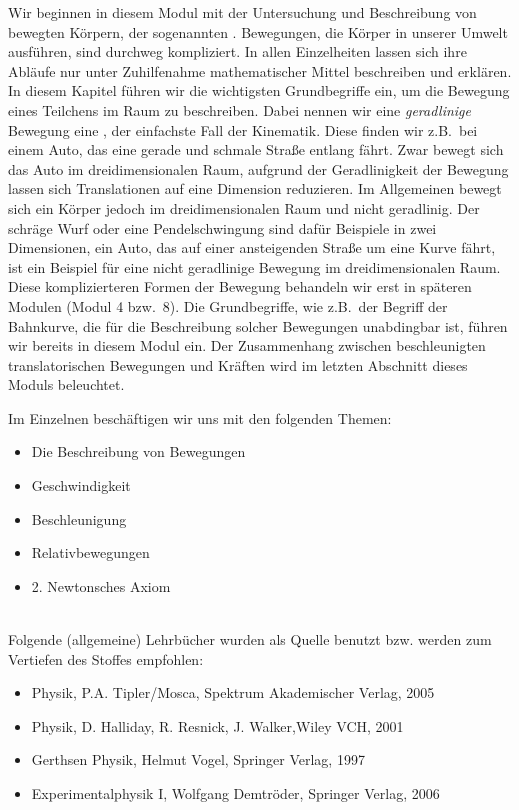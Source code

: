 




\MSetSubject{\MINTPhysics}


\begin{MSectionStart}
Wir beginnen in diesem Modul mit der Untersuchung und Beschreibung von bewegten K\"orpern, der sogenannten .
Bewegungen, die K\"orper in unserer Umwelt ausf\"uhren, sind durchweg kompliziert. In allen Einzelheiten lassen sich ihre Abl\"aufe nur unter Zuhilfenahme
mathematischer Mittel beschreiben und erkl\"aren. In diesem Kapitel f\"uhren wir die wichtigsten Grundbegriffe ein,
um die Bewegung eines Teilchens im Raum zu beschreiben. Dabei nennen wir eine \textit{geradlinige} Bewegung eine ,
der einfachste Fall der Kinematik. Diese finden wir z.B.~bei einem Auto, das eine gerade und schmale Stra{\ss}e entlang f\"ahrt. Zwar bewegt sich das Auto
im dreidimensionalen Raum, aufgrund der Geradlinigkeit der Bewegung lassen sich Translationen auf eine Dimension reduzieren. Im Allgemeinen bewegt sich ein
K\"orper jedoch im dreidimensionalen Raum und nicht geradlinig. Der schr\"age Wurf oder eine Pendelschwingung sind daf\"ur Beispiele in zwei Dimensionen,
ein Auto, das auf einer ansteigenden Stra{\ss}e um eine Kurve f\"ahrt, ist ein Beispiel f\"ur eine nicht geradlinige Bewegung im dreidimensionalen Raum.
Diese komplizierteren Formen der Bewegung behandeln wir erst in sp\"ateren Modulen (Modul 4 bzw.~8). Die Grundbegriffe, wie z.B.~der Begriff der Bahnkurve,
die f\"ur die Beschreibung solcher Bewegungen unabdingbar ist, f\"uhren wir bereits in diesem Modul ein. Der Zusammenhang zwischen beschleunigten translatorischen
Bewegungen und Kr\"aften wird im letzten Abschnitt dieses Moduls beleuchtet.



 Im Einzelnen besch\"aftigen wir uns mit den folgenden Themen:
  
\begin{itemize}
\item Die Beschreibung von Bewegungen
\item Geschwindigkeit
\item Beschleunigung
\item Relativbewegungen
\item 2. Newtonsches Axiom
\end{itemize}
\ \\[0.5cm]
Folgende (allgemeine) Lehrb\"ucher wurden als Quelle benutzt bzw. werden zum Vertiefen des Stoffes empfohlen:  
\begin{itemize} 
\item Physik, P.A. Tipler/Mosca, Spektrum Akademischer Verlag, 2005
\item Physik, D. Halliday, R. Resnick, J. Walker,Wiley VCH, 2001
\item Gerthsen Physik, Helmut Vogel, Springer Verlag, 1997
\item Experimentalphysik I, Wolfgang Demtr\"oder, Springer Verlag, 2006
\end{itemize}

\end{MSectionStart}


